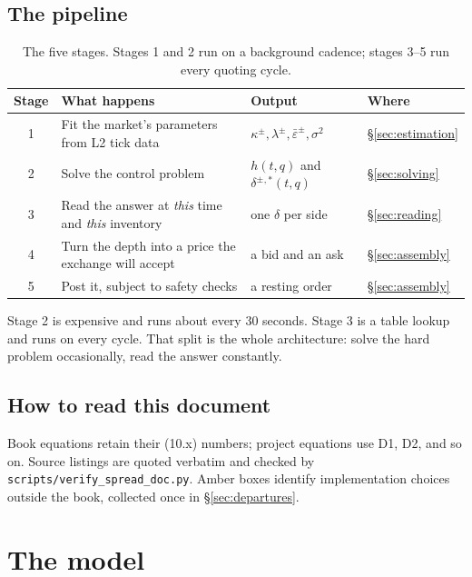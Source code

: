 \documentclass[11pt,a4paper]{article}
\newcommand{\dpm}{\delta^{\pm}}
\newcommand{\epsb}{\bar{\varepsilon}}
\newcommand{\code}[1]{\texttt{\small #1}}
\begin{document}
\subsection{The pipeline}

\begin{table}[htbp]
\centering
\small
\begin{tabular}{@{}c p{6.4cm} l l@{}}
\toprule
\textbf{Stage} & \textbf{What happens} & \textbf{Output} & \textbf{Where} \\
\midrule
1 & Fit the market's parameters from L2 tick data
  & $\kappa^{\pm},\lambda^{\pm},\epsb^{\pm},\sigma^{2}$
  & \S\ref{sec:estimation} \\[2pt]
2 & Solve the control problem
  & $h(t,q)$ and $\dpm{}^{,*}(t,q)$
  & \S\ref{sec:solving} \\[2pt]
3 & Read the answer at \emph{this} time and \emph{this} inventory
  & one $\delta$ per side
  & \S\ref{sec:reading} \\[2pt]
4 & Turn the depth into a price the exchange will accept
  & a bid and an ask
  & \S\ref{sec:assembly} \\[2pt]
5 & Post it, subject to safety checks
  & a resting order
  & \S\ref{sec:assembly} \\
\bottomrule
\end{tabular}
\caption{The five stages. Stages 1 and 2 run on a background cadence; stages 3--5
run every quoting cycle.}
\end{table}

\begin{intuition}
Stage 2 is expensive and runs about every 30 seconds. Stage 3 is a table lookup
and runs on every cycle. That split is the whole architecture: solve the hard
problem occasionally, read the answer constantly.
\end{intuition}

\subsection{How to read this document}

Book equations retain their (10.x) numbers; project equations use D1, D2, and
so on. Source listings are quoted verbatim and checked by
\code{scripts/verify\_spread\_doc.py}. Amber boxes identify implementation
choices outside the book, collected once in \S\ref{sec:departures}.

\section{The model}
\label{sec:model}
\end{document}
